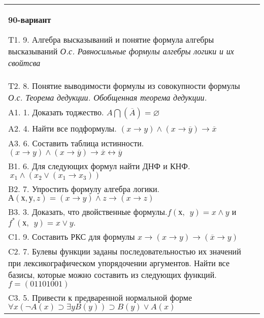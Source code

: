 \documentclass{article}
\begin{document}
\begin{tabular}{m{17cm}}
\textbf{90-вариант}
\newline

T1. 9. Алгебра высказываний и понятие формула алгебры высказываний \emph{О.с. Равносильные формулы алгебры логики и их свойтсва} \\
T2. 8. Понятие выводимости формулы из совокупности формулы \emph{О.с. Теорема дедукции. Обобщенная теорема дедукции.} \\
A1. 1. Доказать тоджество. \(A\bigcap(\overline{A}) = \varnothing\) \\
A2. 4. Найти все подформулы. \((x \rightarrow y) \land (x \rightarrow \overline{y}) \rightarrow \overline{x}\) \\
A3. 6. Составить таблица истинности. \((x \rightarrow y) \land (x \rightarrow \overline{y}) \rightarrow \overline{x} \leftrightarrow \overline{y}\) \\
B1. 6. Для следующих формул найти ДНФ и КНФ. \(\ x_{1} \land (x_{2} \vee (x_{1} \rightarrow x_{3}))\) \\
B2. 7. Упростить формулу алгебра логики. \(А(х,у,z) = (x \rightarrow y) \land z \rightarrow (x \rightarrow z)\) \\
B3. 3. Доказать, что двойственные формулы.\(f(х,\ \ y) = x \land y\) и \(f^{*}(х,\ \ y) = x \vee y.\) \\
C1. 9. Составить РКС для формулы \(x \rightarrow (x \rightarrow y) \rightarrow (\overline{x} \rightarrow y)\ \) \\
C2. 7. Булевы функции заданы последовательностью их значений при лексикографическом упорядочении аргументов. Найти все базисы, которые можно составить из следующих функций. \(f = (01101001)\) \\
C3. 5. Привести к предваренной нормальной форме \(\forall x(\neg A(x) \supset \exists yB(y)) \supset B(y) \vee A(x)\) \\

\end{tabular}
\vspace{1cm}
\end{document}
